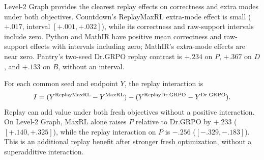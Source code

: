 \begin{table}[H]
  \centering
  \caption{\textbf{Replay effects on the harder Level-2 tasks at pass 8.}
  MaxRL and Dr.GRPO identify the fresh objective; each effect is its replay
  variant minus the corresponding objective without replay. Each row uses
  its own pairwise intersection, which can exceed the four-method
  intersection. Brackets give paired Student-$t$ intervals for $\Delta B$
  only when all five registered pairs are available.}
  \label{tab:current-e119}
  \scriptsize
  \setlength{\tabcolsep}{3pt}
\end{table}


Level-2 Graph provides the clearest replay effects on correctness and extra
modes under both objectives. Countdown's ReplayMaxRL extra-mode effect is
small ($+.017$, interval $[+.001,+.032]$), while its correctness and raw-support
intervals include zero. Python and MathIR have positive mean correctness
and raw-support effects with intervals including zero; MathIR's extra-mode
effects are near zero. Pantry's two-seed Dr.GRPO replay contrast is
$+.234$ on $P$, $+.367$ on $D$, and $+.133$ on $B$, without an interval.

For each common seed and endpoint $Y$, the replay interaction is
\[
 I=(Y^{\rm ReplayMaxRL}-Y^{\rm MaxRL})
    -(Y^{\rm ReplayDr.GRPO}-Y^{\rm Dr.GRPO}).
\]
Replay can add value under both fresh objectives without a positive
interaction. On Level-2 Graph, MaxRL alone raises $P$ relative to Dr.GRPO
by $+.233$ ($[+.140,+.325]$), while the replay interaction on $P$ is
$-.256$ ($[-.329,-.183]$). This is an additional replay benefit after
stronger fresh optimization, without a superadditive interaction.

\begin{table}[H]
  \centering
  \caption{\textbf{Fresh-objective effects and replay interactions on Level 2.}
  All three contrasts within a domain use the same four-arm seed
  intersection. The interaction is
  $(\mathrm{ReplayMaxRL}-\mathrm{MaxRL})-
  (\mathrm{ReplayDr.GRPO}-\mathrm{Dr.GRPO})$.
  Each entry gives its mean and, only for a complete five-seed block, a
  paired unadjusted 95\% Student-$t$ interval. Archived four-arm exports:
  \href{https://huggingface.co/od2961/maxent-grpo-models/blob/main/experiments/E119/README.md\#models}{E119 model index}.}
  \label{tab:level2-factorial-contrasts}
  \scriptsize
  \setlength{\tabcolsep}{3pt}
\end{table}


